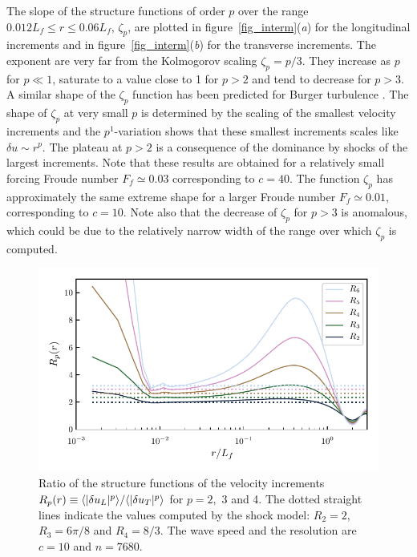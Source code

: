 The slope of the structure functions of order $p$ over the range
$0.012 L_f\leqslant r \leqslant 0.06 L_f$, $\zeta_p$, are plotted in
figure~\ref{fig_interm}(\textit{a}) for the longitudinal increments
and in figure~\ref{fig_interm}(\textit{b}) for the transverse
increments.
%
The exponent are very far from the Kolmogorov scaling $\zeta_p = p/3$.
They increase as $p$ for $p\ll1$, saturate to a value close to 1 for
$p>2$ and tend to decrease for $p>3$.
%
A similar shape of the $\zeta_p$ function has been predicted for
Burger turbulence \cite[]{BouchaudMezardParisi1995}.
%
The shape of $\zeta_p$ at very small $p$ is determined by the
scaling of the smallest velocity increments and the $p^1$-variation
shows that these smallest increments scales like $\delta u \sim r^p$.
%
The plateau at $p > 2$ is a consequence of the dominance by shocks of
the largest increments.
%
Note that these results are obtained for a relatively small forcing
Froude number $F_f \simeq 0.03$ corresponding to $c=40$.  The function
$\zeta_p$ has approximately the same extreme shape for a larger Froude
number $F_f \simeq 0.01$, corresponding to $c=10$.  Note also that the
decrease of $\zeta_p$ for $p>3$ is anomalous, which could be due to
the relatively narrow width of the range over which $\zeta_p$ is
computed.



\begin{figure}
\centerline{\includegraphics[width=\halfwidth]{../Pyfig/fig_ratio_strfct}}
\caption{
Ratio of the structure functions of the velocity increments 
$R_p(r) \equiv \langle |\delta u_L|^p \rangle / \langle |\delta u_T|^p \rangle$
for $p = 2,$ 3 and 4.
The dotted straight lines indicate the values computed by the shock model:
$R_2 = 2$, $R_3 = 6\pi/8$ and $R_4 = 8/3$.
%
The wave speed and the resolution are $c = 10$ and $n = 7680$.  }
\label{fig_ratio}
\end{figure}


